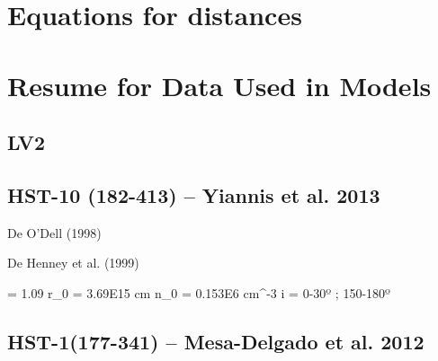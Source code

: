 
\section{Equations for distances}


\section{Resume for Data Used in Models}

\subsection{LV2}

\subsection{HST-10 (182-413) -- Yiannis et al. 2013}

De O'Dell (1998)



De Henney et al. (1999)

\tau \ha = 1.09
r_0 = 3.69E15 cm
n_0 = 0.153E6 cm^{-3}
i = 0-30º ; 150-180º

\subsection{HST-1(177-341) -- Mesa-Delgado et al. 2012}